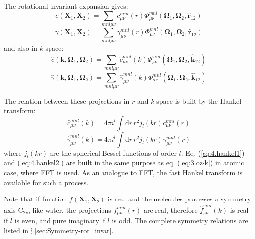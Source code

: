 The rotational invariant expansion gives:
\begin{equation}
c(\mathbf{X}_{1},\mathbf{X}_{2})=\sum_{mnl\mu\nu}c_{\mu\nu}^{mnl}(r)\Phi_{\mu\nu}^{mnl}(\mathbf{\Omega}_{1},\mathbf{\Omega}_{2},\mathbf{\hat{r}}_{12})
\end{equation}
\begin{equation}
\gamma(\mathbf{X}_{1},\mathbf{X}_{2})=\sum_{mnl\mu\nu}\gamma_{\mu\nu}^{mnl}(r)\Phi_{\mu\nu}^{mnl}(\mathbf{\Omega}_{1},\mathbf{\Omega}_{2},\mathbf{\hat{r}}_{12})
\end{equation}
and also in $k$-space:
\begin{equation}
\hat{c}(\mathbf{k},\mathbf{\Omega}_{1},\mathbf{\Omega}_{2})=\sum_{mnl\mu\nu}\hat{c}_{\mu\nu}^{mnl}(k)\Phi_{\mu\nu}^{mnl}(\mathbf{\Omega}_{1},\mathbf{\Omega}_{2},\mathbf{\hat{k}}_{12})
\end{equation}
\begin{equation}
\hat{\gamma}(\mathbf{k},\mathbf{\Omega}_{1},\mathbf{\Omega}_{2})=\sum_{mnl\mu\nu}\hat{\gamma}_{\mu\nu}^{mnl}(k)\Phi_{\mu\nu}^{mnl}(\mathbf{\Omega}_{1},\mathbf{\Omega}_{2},\mathbf{\hat{k}}_{12})
\end{equation}

The relation between these projections in $r$ and $k$-space is
built by the Hankel transform:
\begin{equation}
\hat{c}_{\mu\nu}^{mnl}(k)=4\pi i^{l}\int\mathrm{d}r\,r^{2}j_{l}(kr)c_{\mu\nu}^{mnl}(r)\label{eq:4.hankel1}
\end{equation}
\begin{equation}
\hat{\gamma}_{\mu\nu}^{mnl}(k)=4\pi i^{l}\int\mathrm{d}r\,r^{2}j_{l}(kr)\gamma_{\mu\nu}^{mnl}(r)\label{eq:4.hankel2}
\end{equation}
where $j_{l}(kr)$ are the spherical Bessel functions of order $l$.
Eq. (\ref{eq:4.hankel1}) and (\ref{eq:4.hankel2}) are built in the
same purpose as eq. (\ref{eq:3.oz-k}) in atomic case, where \acs{FFT}
is used. As an analogue to \acs{FFT}, the fast Hankel transform is
available for such a process. 

Note that if function $f(\mathbf{X}_{1},\mathbf{X}_{2})$ is real
and the molecules processes a symmetry axis $\mathrm{C}_{2v}$, like
water, the projections $f_{\mu\nu}^{mnl}(r)$ are real, therefore
$\hat{f}_{\mu\nu}^{mnl}(k)$ is real if $l$ is even, and pure imaginary
if $l$ is odd. The complete symmetry relations are listed in $\mathsection$\ref{sec:Symmetry-rot_invar}.

